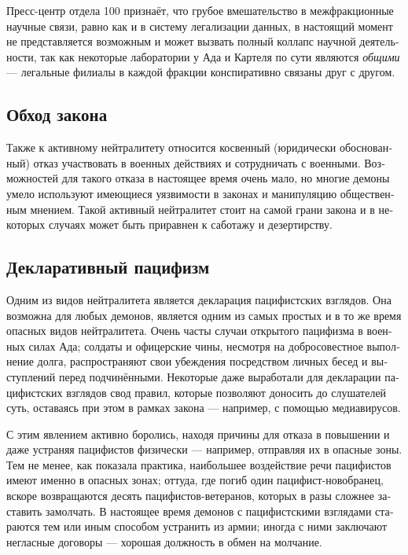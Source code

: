 \documentclass[a4paper,12pt,fleqn]{book}\usepackage{polyglossia}\setdefaultlanguage[babelshorthands=true]{russian}\setotherlanguage{english}\defaultfontfeatures{Ligatures=TeX,Mapping=tex-text}\usepackage{xcolor}\newcommand{\ml}[3]{#2}
\begin{document}
{Пресс-центр отдела 100 признаёт, что грубое вмешательство в межфракционные научные связи, равно как и в систему легализации данных, в настоящий момент не представляется возможным и может вызвать полный коллапс научной деятельности, так как некоторые лаборатории у Ада и Картеля по сути являются \emph{общими} --- легальные филиалы в каждой фракции конспиративно связаны друг с другом.

\subsection{Обход закона}

Также к активному нейтралитету относится косвенный (юридически обоснованный) отказ участвовать в военных действиях и сотрудничать с военными.
Возможностей для такого отказа в настоящее время очень мало, но многие демоны умело используют имеющиеся уязвимости в законах и манипуляцию общественным мнением.
Такой активный нейтралитет стоит на самой грани закона и в некоторых случаях может быть приравнен к саботажу и дезертирству.

\subsection{Декларативный пацифизм}

Одним из видов нейтралитета является декларация пацифистских взглядов.
Она возможна для любых демонов, является одним из самых простых и в то же время опасных видов нейтралитета.
Очень часты случаи открытого пацифизма в военных силах Ада;
солдаты и офицерские чины, несмотря на добросовестное выполнение долга, распространяют свои убеждения посредством личных бесед и выступлений перед подчинёнными.
Некоторые даже выработали для декларации пацифистских взглядов свод правил, которые позволяют доносить до слушателей суть, оставаясь при этом в рамках закона --- например, с помощью медиавирусов.

С этим явлением активно боролись, находя причины для отказа в повышении и даже устраняя пацифистов физически --- например, отправляя их в опасные зоны.
Тем не менее, как показала практика, наибольшее воздействие речи пацифистов имеют именно в опасных зонах;
оттуда, где погиб один пацифист-новобранец, вскоре возвращаются десять пацифистов-ветеранов, которых в разы сложнее заставить замолчать.
В настоящее время демонов с пацифистскими взглядами стараются тем или иным способом устранить из армии;
иногда с ними заключают негласные договоры --- хорошая должность в обмен на молчание.

}
\end{document}
